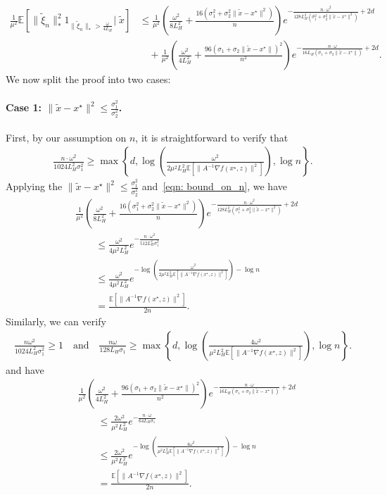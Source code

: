 \documentclass[11pt,twoside]{article}
\numberwithin{equation}{section}
\newcommand{\EE}{\mathbb{E}}
\newcommand{\1}{\mathbf{1}}
\theoremstyle{remark}
\theoremstyle{plain}
\newcommand{\liph}{L_H}
\newcommand{\lmin}{\omega}
\begin{document}
\begin{align*}
\frac{1}{\mu^2}\EE\left[\|\tilde   \xi_n\|_*^2 1_{\|\tilde  \xi_n\|_*  > \frac{\lmin}{4\liph}} \Big|\; \tilde x\right] 
&\le \frac{1}{\mu^2} \left(\frac{\lmin^2}{8\liph^2} + \frac{16(\sigma_1^2+\sigma_2^2 \|\tilde x - x^\star\| ^2)}{n}\right) e^{-\frac{n \cdot \lmin^2}{128 \liph^2  (\sigma_1^2 + \sigma_2^2\|\tilde x -x^\star\|^2)}+2d}\\
&\quad + \frac{1}{\mu^2}\left(\frac{\lmin^2}{4\liph^2} + \frac{96(\sigma_1+\sigma_2 \|\tilde x - x^\star\| )^2}{n^2}\right) e^{-\frac{n \cdot \lmin}{16 \liph  (\sigma_1+ \sigma_2\|\tilde x -x^\star\|)}+2d}.
\end{align*}
We now split the proof into two cases:

\paragraph{Case 1: $\|\tilde x - x^\star\|^2  \le \frac{\sigma_1^2}{\sigma_2^2}$.} First, by our assumption on $n$, it is straightforward to verify that
\begin{align}\label{eqn: bound_on_n}
\frac{n \cdot \lmin^2}{1024 \liph^2 \sigma_1^2} \ge   \max \left \{d, \log \left(\frac{\lmin^2}{2\mu^2 \liph^2 \EE[\|A^{-1} \nabla f(x^\star,z)\|^2]}\right),  \log n \right\}. 
\end{align}
Applying the $\|\tilde x -x^\star\|^2 \le \frac{\sigma_1^2}{\sigma_2^2}$ and~\eqref{eqn: bound_on_n}, we have
\begin{align*}
&\frac{1}{\mu^2} \left(\frac{\lmin^2}{8\liph^2} + \frac{16(\sigma_1^2 + \sigma_2^2\|\tilde x - x^\star\| ^2)}{n}\right) e^{-\frac{n \cdot\lmin^2}{128 \liph^2  (\sigma_1^2 + \sigma_2^2\|\tilde x -x^\star\|^2)}+2d}\\
&\qquad \le  \frac{\lmin^2}{4 \mu^2 \liph^2}  e^{-\frac{n \cdot \lmin^2}{512 \liph^2  \sigma_1^2} }\\
&\qquad \le  \frac{\lmin^2}{4 \mu^2 \liph^2}  e^{- \log \left(\frac{\lmin^2}{2\mu^2 \liph^2 \EE[\|A^{-1} \nabla f(x^\star,z)\|^2]}\right) - \log n}\\
&\qquad = \frac{\EE[\|A^{-1} \nabla f(x^\star,z)\|^2]}{2n}.
\end{align*}
Similarly, we can verify 
\begin{align*}
\frac{n \lmin^2}{1024 \liph^2 \sigma_1^2} \ge 1 \quad \text{and} \quad  \frac{n \lmin}{128 \liph \sigma_1} \ge \max\left\{d, \log \left(\frac{4\lmin^2}{\mu^2 \liph^2 \EE[\|A^{-1} \nabla f(x^\star,z)\|^2]}\right), \log n\right\}.
\end{align*}
and have
\begin{align*}
&\frac{1}{\mu^2}\left(\frac{\lmin^2}{4\liph^2} + \frac{96(\sigma_1+\sigma_2 \|\tilde x - x^\star\| )^2}{n^2}\right) e^{-\frac{n \cdot \lmin}{16 \liph  (\sigma_1+ \sigma_2\|\tilde x -x^\star\| )}+2d}\\
&\qquad \le  \frac{2\lmin^2}{\mu^2 \liph^2} e^{-\frac{n \cdot\lmin}{64 \liph \sigma_1}}\\
&\qquad \le  \frac{2\lmin^2}{ \mu^2 \liph^2}  e^{-\log \left(\frac{4\lmin^2}{\mu^2 \liph^2 \EE[\|A^{-1} \nabla f(x^\star,z)\|^2]}\right) - \log n}\\
&\qquad = \frac{\EE[\|A^{-1} \nabla f(x^\star,z)\|^2]}{2n}.	
\end{align*}
\end{document}
